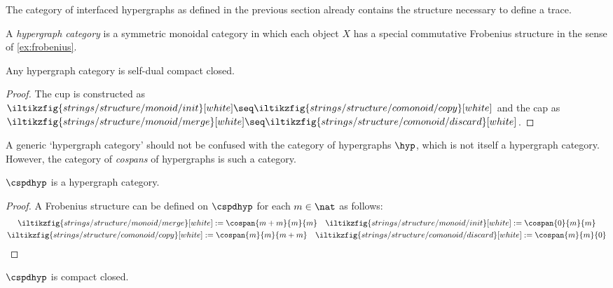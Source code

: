 The category of interfaced hypergraphs as defined in the previous section
already contains the structure necessary to define a trace.

\begin{definition}
    A \emph{hypergraph category} is a symmetric monoidal category in which
    each object \(X\) has a special commutative Frobenius structure in the sense
    of \cref{ex:frobenius}.
\end{definition}

\begin{proposition}
    Any hypergraph category is self-dual compact closed.
\end{proposition}
\begin{proof}
    The cup is constructed as \(
        \iltikzfig{strings/structure/monoid/init}[white]
        \seq
        \iltikzfig{strings/structure/comonoid/copy}[white]
    \) and the cap as \(
        \iltikzfig{strings/structure/monoid/merge}[white]
        \seq
        \iltikzfig{strings/structure/comonoid/discard}[white]
    \).
\end{proof}

A generic `hypergraph category' should not be confused with the
category of hypergraphs \(\hyp\), which is not itself a hypergraph category.
However, the category of \emph{cospans} of hypergraphs is such a category.

\begin{proposition}\label{prop:frobenius-map}
    \(\cspdhyp\) is a hypergraph category.
\end{proposition}
\begin{proof}
    A Frobenius structure can be defined on \(\cspdhyp\) for each \(m \in \nat\)
    as follows:
    \begin{gather*}
        \iltikzfig{strings/structure/monoid/merge}[white]
        :=
        \cospan{m + m}{m}{m}
        \quad
        \iltikzfig{strings/structure/monoid/init}[white]
        :=
        \cospan{0}{m}{m}
        \\
        \iltikzfig{strings/structure/comonoid/copy}[white]
        :=
        \cospan{m}{m}{m+m}
        \quad
        \iltikzfig{strings/structure/comonoid/discard}[white]
        :=
        \cospan{m}{m}{0}
        \qedhere
    \end{gather*}
\end{proof}

\begin{corollary}
    \(\cspdhyp\) is compact closed.
\end{corollary}

